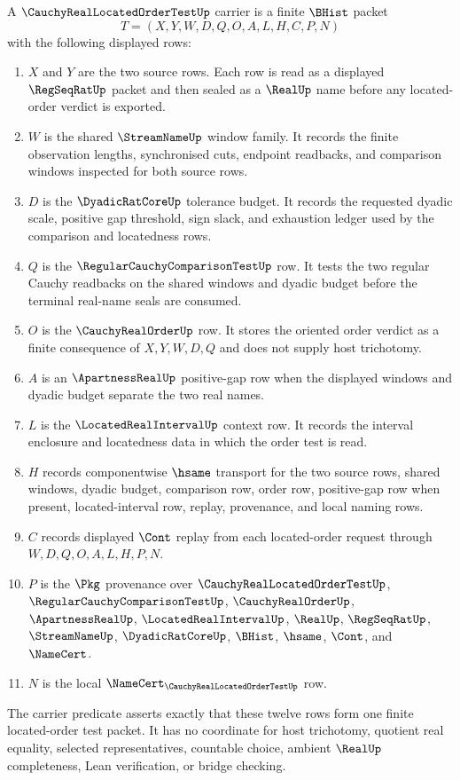 \begin{definition}
\label{def:cauchy-real-located-order-test-carrier}
A $\CauchyRealLocatedOrderTestUp$ carrier is a finite $\BHist$ packet
$$
T=(X,Y,W,D,Q,O,A,L,H,C,P,N)
$$
with the following displayed rows:
\begin{enumerate}
\item $X$ and $Y$ are the two source rows. Each row is read as a displayed $\RegSeqRatUp$ packet and then sealed as a $\RealUp$ name before any located-order verdict is exported.
\item $W$ is the shared $\StreamNameUp$ window family. It records the finite observation lengths, synchronised cuts, endpoint readbacks, and comparison windows inspected for both source rows.
\item $D$ is the $\DyadicRatCoreUp$ tolerance budget. It records the requested dyadic scale, positive gap threshold, sign slack, and exhaustion ledger used by the comparison and locatedness rows.
\item $Q$ is the $\RegularCauchyComparisonTestUp$ row. It tests the two regular Cauchy readbacks on the shared windows and dyadic budget before the terminal real-name seals are consumed.
\item $O$ is the $\CauchyRealOrderUp$ row. It stores the oriented order verdict as a finite consequence of $X,Y,W,D,Q$ and does not supply host trichotomy.
\item $A$ is an $\ApartnessRealUp$ positive-gap row when the displayed windows and dyadic budget separate the two real names.
\item $L$ is the $\LocatedRealIntervalUp$ context row. It records the interval enclosure and locatedness data in which the order test is read.
\item $H$ records componentwise $\hsame$ transport for the two source rows, shared windows, dyadic budget, comparison row, order row, positive-gap row when present, located-interval row, replay, provenance, and local naming rows.
\item $C$ records displayed $\Cont$ replay from each located-order request through $W,D,Q,O,A,L,H,P,N$.
\item $P$ is the $\Pkg$ provenance over $\CauchyRealLocatedOrderTestUp$, $\RegularCauchyComparisonTestUp$, $\CauchyRealOrderUp$, $\ApartnessRealUp$, $\LocatedRealIntervalUp$, $\RealUp$, $\RegSeqRatUp$, $\StreamNameUp$, $\DyadicRatCoreUp$, $\BHist$, $\hsame$, $\Cont$, and $\NameCert$.
\item $N$ is the local $\NameCert_{\CauchyRealLocatedOrderTestUp}$ row.
\end{enumerate}
The carrier predicate asserts exactly that these twelve rows form one finite located-order test packet. It has no coordinate for host trichotomy, quotient real equality, selected representatives, countable choice, ambient $\RealUp$ completeness, Lean verification, or bridge checking.
\end{definition}

